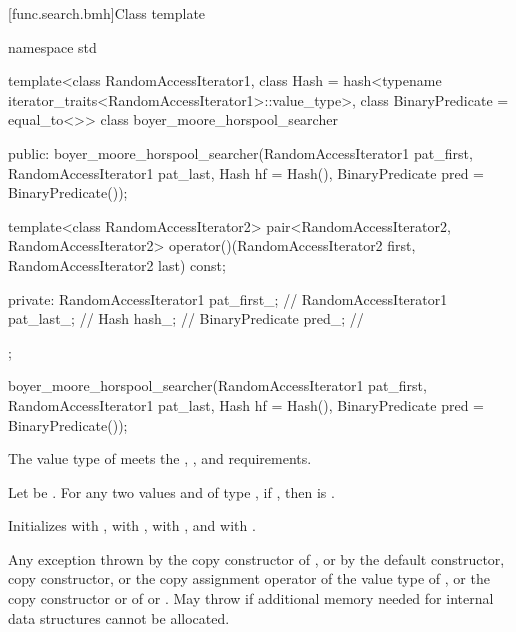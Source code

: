 [func.search.bmh]{Class template }

%
\begin{codeblock}
namespace std {
  template<class RandomAccessIterator1,
           class Hash = hash<typename iterator_traits<RandomAccessIterator1>::value_type>,
           class BinaryPredicate = equal_to<>>
  class boyer_moore_horspool_searcher {
  public:
    boyer_moore_horspool_searcher(RandomAccessIterator1 pat_first,
                                  RandomAccessIterator1 pat_last,
                                  Hash hf = Hash(),
                                  BinaryPredicate pred = BinaryPredicate());

    template<class RandomAccessIterator2>
      pair<RandomAccessIterator2, RandomAccessIterator2>
        operator()(RandomAccessIterator2 first, RandomAccessIterator2 last) const;

  private:
    RandomAccessIterator1 pat_first_;   // \expos
    RandomAccessIterator1 pat_last_;    // \expos
    Hash hash_;                         // \expos
    BinaryPredicate pred_;              // \expos
  };
}
\end{codeblock}

%
\begin{itemdecl}
boyer_moore_horspool_searcher(RandomAccessIterator1 pat_first,
                              RandomAccessIterator1 pat_last,
                              Hash hf = Hash(),
                              BinaryPredicate pred = BinaryPredicate());
\end{itemdecl}

\begin{itemdescr}
\pnum
\expects
The value type of  meets the ,
, and  requirements.

\pnum
Let  be .
For any two values  and  of type ,
if , then  is .

\pnum
\effects
Initializes
 with ,
 with ,
 with , and
\mbox{} with .

\pnum
\throws
Any exception thrown by the copy constructor of ,
or by the default constructor, copy constructor, or the copy assignment operator of the value type of ,
or the copy constructor or  of  or .
May throw  if additional memory needed for internal data structures cannot be allocated.
\end{itemdescr}

